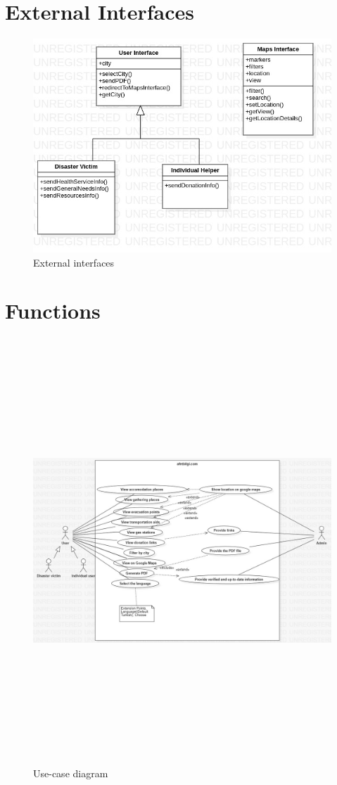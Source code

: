 \documentclass[12pt]{report}
\begin{document}
\section{External Interfaces}

\begin{figure}[H]
    \includegraphics[scale=0.5]{ext1}
    \centering
    \caption{External interfaces}
\end{figure}

\section{Functions}

\begin{figure}[H]
    \includegraphics[height=16cm, width=17cm]{use-case}
    \caption{Use-case diagram}
\end{figure}
\end{document}
